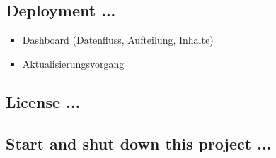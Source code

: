 \subsection{Deployment ...}\label{subsec:deployment}
\begin{itemize}
    \item Dashboard (Datenfluss, Aufteilung, Inhalte)
    \item Aktualisierungsvorgang
\end{itemize}

\subsection{License ...}\label{subsec:license}

\subsection{Start and shut down this project ...}\label{subsec:start-and-shut-down-this-project-...}
